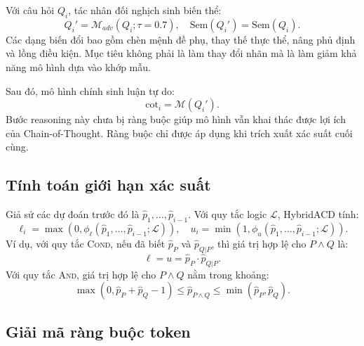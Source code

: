 \documentclass[pdflatex,sn-mathphys-num,oneside]{sn-jnl}
\begin{document}
Với câu hỏi $Q_i$, tác nhân đối nghịch sinh biến thể:
\begin{equation}
  Q_i' = \mathcal{M}_{adv}(Q_i;\tau=0.7),
  \quad \text{Sem}(Q_i')=\text{Sem}(Q_i).
\end{equation}
Các dạng biến đổi bao gồm chèn mệnh đề phụ, thay thế thực thể, nâng phủ định và lồng điều kiện. Mục tiêu không phải là làm thay đổi nhãn mà là làm giảm khả năng mô hình dựa vào khớp mẫu.

Sau đó, mô hình chính sinh luận tự do:
\begin{equation}
  \text{cot}_i=\mathcal{M}(Q_i').
\end{equation}
Bước reasoning này chưa bị ràng buộc giúp mô hình vẫn khai thác được lợi ích của Chain-of-Thought. Ràng buộc chỉ được áp dụng khi trích xuất xác suất cuối cùng.

\subsection{Tính toán giới hạn xác suất}

Giả sử các dự đoán trước đó là $\hat{p}_1,\ldots,\hat{p}_{i-1}$. Với quy tắc logic $\mathcal{L}$, HybridACD tính:
\begin{equation}
  \ell_i = \max(0,\phi_{\ell}(\hat{p}_1,\ldots,\hat{p}_{i-1};\mathcal{L})),
  \quad
  u_i = \min(1,\phi_{u}(\hat{p}_1,\ldots,\hat{p}_{i-1};\mathcal{L})).
  \label{eq:bounds}
\end{equation}
Ví dụ, với quy tắc \textsc{Cond}, nếu đã biết $\hat{p}_P$ và $\hat{p}_{Q|P}$, thì giá trị hợp lệ cho $P\wedge Q$ là:
\begin{equation}
  \ell=u=\hat{p}_P \cdot \hat{p}_{Q|P}.
\end{equation}
Với quy tắc \textsc{And}, giá trị hợp lệ cho $P\wedge Q$ nằm trong khoảng:
\begin{equation}
  \max(0,\hat{p}_P+\hat{p}_Q-1)
  \leq \hat{p}_{P\wedge Q}
  \leq
  \min(\hat{p}_P,\hat{p}_Q).
\end{equation}

\subsection{Giải mã ràng buộc token}
\end{document}
